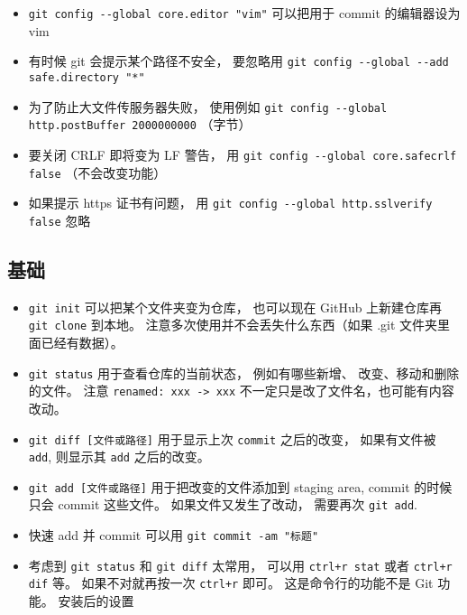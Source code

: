 \begin{itemize}
\item \verb|git config --global core.editor "vim"| 可以把用于 commit 的编辑器设为 vim
\item 有时候 git 会提示某个路径不安全， 要忽略用 \verb|git config --global --add safe.directory "*"|
\item 为了防止大文件传服务器失败， 使用例如 \verb|git config --global http.postBuffer 2000000000| （字节）
\item 要关闭 CRLF 即将变为 LF 警告， 用 \verb|git config --global core.safecrlf false| （不会改变功能）
\item 如果提示 https 证书有问题， 用 \verb|git config --global http.sslverify false| 忽略
\end{itemize}

\subsection{基础}
\begin{itemize}
\item \verb|git init| 可以把某个文件夹变为仓库， 也可以现在 GitHub 上新建仓库再 \verb|git clone| 到本地。 注意多次使用并不会丢失什么东西（如果 .git 文件夹里面已经有数据）。
\item \verb|git status| 用于查看仓库的当前状态， 例如有哪些新增、 改变、移动和删除的文件。 注意 \verb|renamed: xxx -> xxx| 不一定只是改了文件名，也可能有内容改动。
\item \verb|git diff [文件或路径]| 用于显示上次 \verb|commit| 之后的改变， 如果有文件被 \verb|add|, 则显示其 \verb|add| 之后的改变。
\item \verb|git add [文件或路径]| 用于把改变的文件添加到 staging area, commit 的时候只会 commit 这些文件。 如果文件又发生了改动， 需要再次 \verb|git add|.
\item 快速 add 并 commit 可以用 \verb|git commit -am "标题"|
\item 考虑到 \verb|git status| 和 \verb|git diff| 太常用， 可以用 \verb|ctrl+r stat| 或者 \verb|ctrl+r dif| 等。 如果不对就再按一次 \verb|ctrl+r| 即可。 这是命令行的功能不是 Git 功能。
安装后的设置
\end{itemize}

